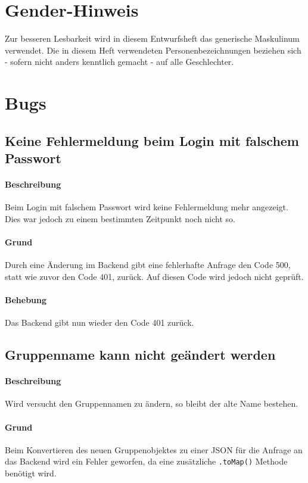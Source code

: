 \documentclass{qualitätssicherungsheft}
\begin{document}

\maketitle
\tableofcontents
\newpage

\section*{Gender-Hinweis}
Zur besseren Lesbarkeit wird in diesem Entwurfsheft das generische Maskulinum verwendet.
Die in diesem Heft verwendeten Personenbezeichnungen beziehen sich - sofern nicht anders kenntlich gemacht - auf alle Geschlechter.
\newpage
\section{Bugs}
\subsection{Keine Fehlermeldung beim Login mit falschem Passwort}
\paragraph*{Beschreibung} Beim Login mit falschem Passwort wird keine Fehlermeldung mehr angezeigt. Dies war jedoch zu einem bestimmten Zeitpunkt noch nicht so.
\paragraph{Grund} Durch eine Änderung im Backend 
gibt eine fehlerhafte Anfrage den Code 500, statt wie zuvor den Code 401, zurück. Auf diesen Code wird jedoch nicht geprüft.
\paragraph{Behebung} Das Backend gibt nun wieder den Code 401 zurück.
\newpage
\subsection{Gruppenname kann nicht geändert werden}
\paragraph*{Beschreibung} Wird versucht den Gruppennamen zu ändern, so bleibt der alte Name bestehen.
\paragraph{Grund} Beim Konvertieren des neuen Gruppenobjektes zu einer JSON für die Anfrage an das Backend wird ein Fehler geworfen, da eine zusätzliche \texttt{.toMap()} Methode benötigt wird.
\end{document}
